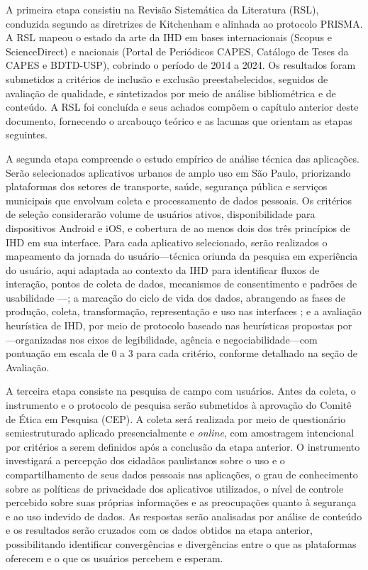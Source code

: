 \documentclass[
	12pt,				%
	oneside,			%
	a4paper,			%
	english,			%
	brazil				%
	]{abntex2ppgsi}
\begin{document}
    A primeira etapa consistiu na Revisão Sistemática da Literatura (RSL), conduzida segundo as diretrizes de Kitchenham e alinhada ao protocolo PRISMA. A RSL mapeou o estado da arte da IHD em bases internacionais (Scopus e ScienceDirect) e nacionais (Portal de Periódicos CAPES, Catálogo de Teses da CAPES e BDTD-USP), cobrindo o período de 2014 a 2024. Os resultados foram submetidos a critérios de inclusão e exclusão preestabelecidos, seguidos de avaliação de qualidade, e sintetizados por meio de análise bibliométrica e de conteúdo. A RSL foi concluída e seus achados compõem o capítulo anterior deste documento, fornecendo o arcabouço teórico e as lacunas que orientam as etapas seguintes.

    A segunda etapa compreende o estudo empírico de análise técnica das aplicações. Serão selecionados aplicativos urbanos de amplo uso em São Paulo, priorizando plataformas dos setores de transporte, saúde, segurança pública e serviços municipais que envolvam coleta e processamento de dados pessoais. Os critérios de seleção considerarão volume de usuários ativos, disponibilidade para dispositivos Android e iOS, e cobertura de ao menos dois dos três princípios de IHD em sua interface. Para cada aplicativo selecionado, serão realizados o mapeamento da jornada do usuário---técnica oriunda da pesquisa em experiência do usuário, aqui adaptada ao contexto da IHD para identificar fluxos de interação, pontos de coleta de dados, mecanismos de consentimento e padrões de usabilidade \cite{Rose}---; a marcação do ciclo de vida dos dados, abrangendo as fases de produção, coleta, transformação, representação e uso nas interfaces \cite{Strey2019Human, Hornung2015}; e a avaliação heurística de IHD, por meio de protocolo baseado nas heurísticas propostas por ---organizadas nos eixos de legibilidade, agência e negociabilidade---com pontuação em escala de 0 a 3 para cada critério, conforme detalhado na seção de Avaliação.

    A terceira etapa consiste na pesquisa de campo com usuários. Antes da coleta, o instrumento e o protocolo de pesquisa serão submetidos à aprovação do Comitê de Ética em Pesquisa (CEP). A coleta será realizada por meio de questionário semiestruturado aplicado presencialmente e \textit{online}, com amostragem intencional por critérios a serem definidos após a conclusão da etapa anterior. O instrumento investigará a percepção dos cidadãos paulistanos sobre o uso e o compartilhamento de seus dados pessoais nas aplicações, o grau de conhecimento sobre as políticas de privacidade dos aplicativos utilizados, o nível de controle percebido sobre suas próprias informações e as preocupações quanto à segurança e ao uso indevido de dados. As respostas serão analisadas por análise de conteúdo e os resultados serão cruzados com os dados obtidos na etapa anterior, possibilitando identificar convergências e divergências entre o que as plataformas oferecem e o que os usuários percebem e esperam.
\end{document}
